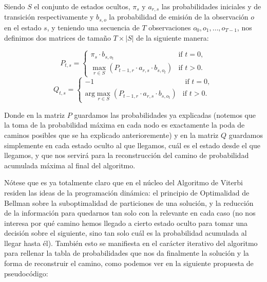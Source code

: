 \documentclass{article}
\begin{document}
Siendo $S$ el conjunto de estados ocultos, $\pi_{s} \text{ y }a_{r,s}$ las probabilidades iniciales y de transición respectivamente y $b_{s,o}$ la probabilidad de emisión de la observación
$o$ en el estado $s$,  y 
teniendo una secuencia de $T$ observaciones $o_0,o_1, \ldots , o_{T-1}$, nos definimos dos matrices de tamaño $T \times \left|S\right|$ de la siguiente manera:

\begin{equation*}
    P_{t,s} =
    \begin{cases}
	\pi_s \cdot b_{s,o_t} & \text{if } t=0, \\
	\max_{r \in S} \left(P_{t-1,r} \cdot a_{r,s} \cdot b_{s,o_t} \right) & \text{if } t>0.
    \end{cases}
\end{equation*} 
\begin{equation*}
    Q_{t,s} =
    \begin{cases}
	-1 & \text{ if } t = 0, \\
	\text{arg}\max_{r \in S} \left(P_{t-1,r} \cdot a_{r,s} \cdot b_{s,o_t} \right) & \text{if } t>0.
    \end{cases}
\end{equation*} 

Donde en la matriz $P$ guardamos las probabilidades ya explicadas (notemos que la toma de la probabilidad máxima en cada nodo
es exactamente la poda de caminos posibles que se ha explicado
anterioremente) y en la matriz $Q$ guardamos simplemente
en cada estado oculto al que llegamos, cuál es el estado
desde el que llegamos, y que nos servirá para la reconstrucción
del camino de probabilidad acumulada máxima al final del
algoritmo. 

Nótese que es ya totalmente claro que en el núcleo del Algoritmo de Viterbi residen las ideas de la programación dinámica:
el principio de Optimalidad de Bellman sobre la suboptimalidad
de particiones de una solución, y la reducción de la información para quedarnos tan solo con la relevante en cada caso (no nos
interesa por qué camino hemos llegado a cierto estado oculto para tomar una decisión sobre el siguiente, sino tan solo cuál es la probabilidad acumulada al llegar hasta él). También esto
se manifiesta en el carácter iterativo del algoritmo para
rellenar la tabla de probabilidades que nos da finalmente
la solución y la forma de reconstruir el camino, como podemos
ver en la siguiente propuesta de pseudocódigo:
\end{document}
